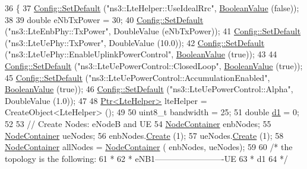 \begin{DoxyCode}
36 \{       
37   \hyperlink{group__config_ga2e7882df849d8ba4aaad31c934c40c06}{Config::SetDefault} (\textcolor{stringliteral}{"ns3::LteHelper::UseIdealRrc"}, 
      \hyperlink{classns3_1_1BooleanValue}{BooleanValue} (\textcolor{keyword}{false}));
38 
39   \textcolor{keywordtype}{double} eNbTxPower = 30;
40   \hyperlink{group__config_ga2e7882df849d8ba4aaad31c934c40c06}{Config::SetDefault} (\textcolor{stringliteral}{"ns3::LteEnbPhy::TxPower"}, DoubleValue (eNbTxPower));
41   \hyperlink{group__config_ga2e7882df849d8ba4aaad31c934c40c06}{Config::SetDefault} (\textcolor{stringliteral}{"ns3::LteUePhy::TxPower"}, DoubleValue (10.0));
42   \hyperlink{group__config_ga2e7882df849d8ba4aaad31c934c40c06}{Config::SetDefault} (\textcolor{stringliteral}{"ns3::LteUePhy::EnableUplinkPowerControl"}, 
      \hyperlink{classns3_1_1BooleanValue}{BooleanValue} (\textcolor{keyword}{true}));
43 
44   \hyperlink{group__config_ga2e7882df849d8ba4aaad31c934c40c06}{Config::SetDefault} (\textcolor{stringliteral}{"ns3::LteUePowerControl::ClosedLoop"}, 
      \hyperlink{classns3_1_1BooleanValue}{BooleanValue} (\textcolor{keyword}{true}));
45   \hyperlink{group__config_ga2e7882df849d8ba4aaad31c934c40c06}{Config::SetDefault} (\textcolor{stringliteral}{"ns3::LteUePowerControl::AccumulationEnabled"}, 
      \hyperlink{classns3_1_1BooleanValue}{BooleanValue} (\textcolor{keyword}{true}));
46   \hyperlink{group__config_ga2e7882df849d8ba4aaad31c934c40c06}{Config::SetDefault} (\textcolor{stringliteral}{"ns3::LteUePowerControl::Alpha"}, DoubleValue (1.0));
47 
48   \hyperlink{classns3_1_1Ptr}{Ptr<LteHelper>} lteHelper = CreateObject<LteHelper> ();
49 
50   uint8\_t bandwidth = 25;
51   \textcolor{keywordtype}{double} \hyperlink{lte__link__budget__interference_8m_ab5ca0c44c6f0a063a5219b3749db661f}{d1} = 0;
52 
53   \textcolor{comment}{// Create Nodes: eNodeB and UE}
54   \hyperlink{classns3_1_1NodeContainer}{NodeContainer} enbNodes;
55   \hyperlink{classns3_1_1NodeContainer}{NodeContainer} ueNodes;
56   enbNodes.\hyperlink{classns3_1_1NodeContainer_a787f059e2813e8b951cc6914d11dfe69}{Create} (1);
57   ueNodes.\hyperlink{classns3_1_1NodeContainer_a787f059e2813e8b951cc6914d11dfe69}{Create} (1);
58   \hyperlink{classns3_1_1NodeContainer}{NodeContainer} allNodes = \hyperlink{classns3_1_1NodeContainer}{NodeContainer} ( enbNodes, ueNodes);
59 
60 \textcolor{comment}{/*   the topology is the following:}
61 \textcolor{comment}{ *}
62 \textcolor{comment}{ *   eNB1-------------------------UE}
63 \textcolor{comment}{ *                  d1}
64 \textcolor{comment}{ */}

\end{DoxyCode}

